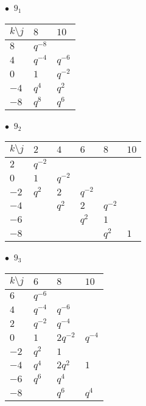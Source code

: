 \begin{minipage}{\linewidth}
$\bullet\ $ $9_{1}$ \vspace{0.5em} \\
\begin{tabular}{l|ll}
$k \setminus j$ & $8$ & $10$ \\
\hline
$8$ & $q^{-8}$ &  \\
$4$ & $q^{-4}$ & $q^{-6}$ \\
$0$ & $1$ & $q^{-2}$ \\
$-4$ & $q^{4}$ & $q^{2}$ \\
$-8$ & $q^{8}$ & $q^{6}$ \\
\end{tabular}
\vspace{2em}
\end{minipage}
%
\begin{minipage}{\linewidth}
$\bullet\ $ $9_{2}$ \vspace{0.5em} \\
\begin{tabular}{l|lllll}
$k \setminus j$ & $2$ & $4$ & $6$ & $8$ & $10$ \\
\hline
$2$ & $q^{-2}$ &  &  &  &  \\
$0$ & $1$ & $q^{-2}$ &  &  &  \\
$-2$ & $q^{2}$ & $2$ & $q^{-2}$ &  &  \\
$-4$ &  & $q^{2}$ & $2$ & $q^{-2}$ &  \\
$-6$ &  &  & $q^{2}$ & $1$ &  \\
$-8$ &  &  &  & $q^{2}$ & $1$ \\
\end{tabular}
\vspace{2em}
\end{minipage}
%
\begin{minipage}{\linewidth}
$\bullet\ $ $9_{3}$ \vspace{0.5em} \\
\begin{tabular}{l|lll}
$k \setminus j$ & $6$ & $8$ & $10$ \\
\hline
$6$ & $q^{-6}$ &  &  \\
$4$ & $q^{-4}$ & $q^{-6}$ &  \\
$2$ & $q^{-2}$ & $q^{-4}$ &  \\
$0$ & $1$ & $2q^{-2}$ & $q^{-4}$ \\
$-2$ & $q^{2}$ & $1$ &  \\
$-4$ & $q^{4}$ & $2q^{2}$ & $1$ \\
$-6$ & $q^{6}$ & $q^{4}$ &  \\
$-8$ &  & $q^{6}$ & $q^{4}$ \\
\end{tabular}
\vspace{2em}
\end{minipage}
